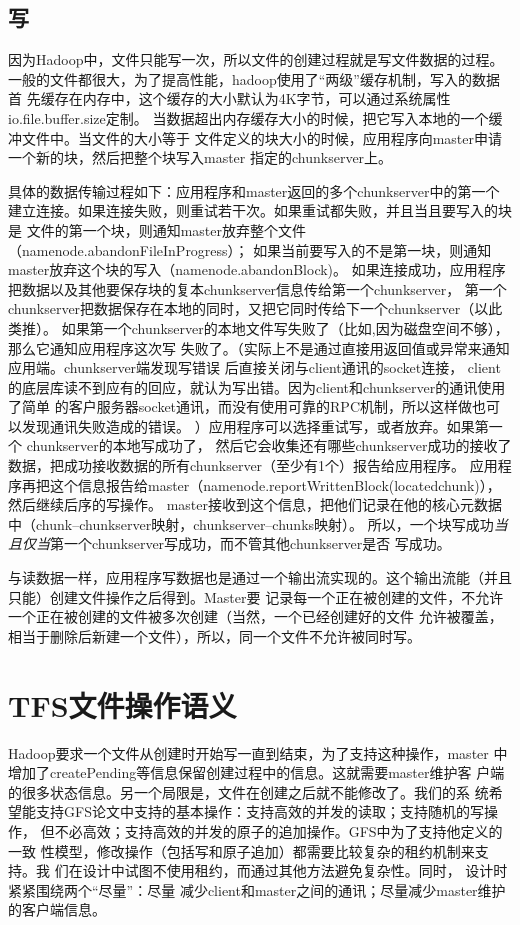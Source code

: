 \documentclass[11pt,a4paper]{scrartcl}
\begin{document}
\begin{CJK*}{UTF8}{gbsn}
\subsection{写}
因为Hadoop中，文件只能写一次，所以文件的创建过程就是写文件数据的过程。
一般的文件都很大，为了提高性能，hadoop使用了“两级”缓存机制，写入的数据首
先缓存在内存中，这个缓存的大小默认为4K字节，可以通过系统属性io.file.buffer.size定制。
当数据超出内存缓存大小的时候，把它写入本地的一个缓冲文件中。当文件的大小等于
文件定义的块大小的时候，应用程序向master申请一个新的块，然后把整个块写入master
指定的chunkserver上。

具体的数据传输过程如下：应用程序和master返回的多个chunkserver中的第一个
建立连接。如果连接失败，则重试若干次。如果重试都失败，并且当且要写入的块是
文件的第一个块，则通知master放弃整个文件（namenode.abandonFileInProgress）；
如果当前要写入的不是第一块，则通知master放弃这个块的写入（namenode.abandonBlock)。
如果连接成功，应用程序把数据以及其他要保存块的复本chunkserver信息传给第一个chunkserver，
第一个chunkserver把数据保存在本地的同时，又把它同时传给下一个chunkserver（以此类推）。
如果第一个chunkserver的本地文件写失败了（比如,因为磁盘空间不够），那么它通知应用程序这次写
失败了。（{\color{red}实际上不是通过直接用返回值或异常来通知应用端。chunkserver端发现写错误
后直接关闭与client通讯的socket连接，
client的底层库读不到应有的回应，就认为写出错。因为client和chunkserver的通讯使用了简单
的客户服务器socket通讯，而没有使用可靠的RPC机制，所以这样做也可以发现通讯失败造成的错误。
}）应用程序可以选择重试写，或者放弃。如果第一个
chunkserver的本地写成功了，
然后它会收集还有哪些chunkserver成功的接收了数据，把成功接收数据的所有chunkserver（至少有1个）报告给应用程序。
应用程序再把这个信息报告给master（namenode.reportWrittenBlock(locatedchunk)），然后继续后序的写操作。
master接收到这个信息，把他们记录在他的核心元数据中（chunk--chunkserver映射，chunkserver--chunks映射）。
所以，一个块写成功\emph{当且仅当}第一个chunkserver写成功，而不管其他chunkserver是否
写成功。

与读数据一样，应用程序写数据也是通过一个输出流实现的。这个输出流能（并且只能）创建文件操作之后得到。Master要
记录每一个正在被创建的文件，不允许一个正在被创建的文件被多次创建（当然，一个已经创建好的文件
允许被覆盖，相当于删除后新建一个文件），所以，同一个文件不允许被同时写。
\section{TFS文件操作语义}
Hadoop要求一个文件从创建时开始写一直到结束，为了支持这种操作，master
中增加了createPending等信息保留创建过程中的信息。这就需要master维护客
户端的很多状态信息。另一个局限是，文件在创建之后就不能修改了。我们的系
统希望能支持GFS论文中支持的基本操作：支持高效的并发的读取；支持随机的写操作，
但不必高效；支持高效的并发的原子的追加操作。GFS中为了支持他定义的一致
性模型，修改操作（包括写和原子追加）都需要比较复杂的租约机制来支持。我
们在设计中试图不使用租约，而通过其他方法避免复杂性。同时，
设计时紧紧围绕两个“尽量”：尽量
减少client和master之间的通讯；尽量减少master维护的客户端信息。

\end{CJK*}
\end{document}
